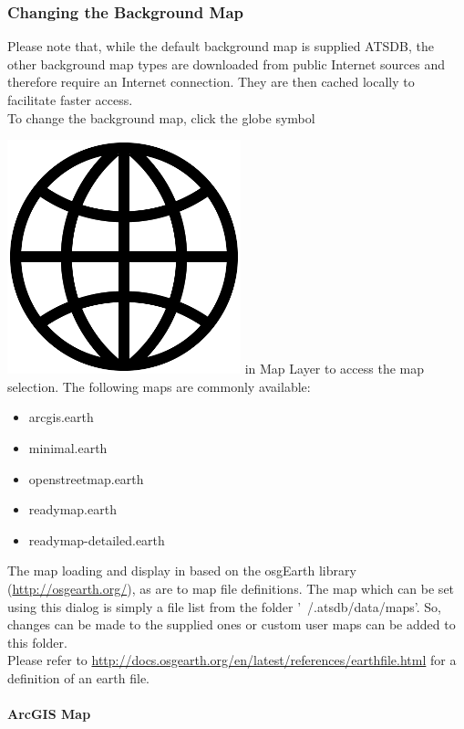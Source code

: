 \documentclass[10pt,letterpaper,extrafontsizes]{memoir}
\begin{document}
\subsubsection{Changing the Background Map}

Please note that, while the default background map is supplied ATSDB, the other background map types are downloaded from public Internet sources and therefore require an Internet connection. They are then cached locally to facilitate faster access. \\

To change the background map, click the globe symbol {\includegraphics[scale=0.05]{../../data/icons/globe.png} in Map Layer to access the map selection. The following maps are commonly available:

\begin{itemize}
 \item arcgis.earth
 \item minimal.earth
 \item openstreetmap.earth
 \item readymap.earth
 \item readymap-detailed.earth
\end{itemize}

The map loading and display in based on the osgEarth library (\url{http://osgearth.org/}), as are to map file definitions. The map which can be set using this dialog is simply a file list from the folder '~/.atsdb/data/maps'. So, changes can be made to the supplied ones or custom user maps can be added to this folder. \\
Please refer to \url{http://docs.osgearth.org/en/latest/references/earthfile.html} for a definition of an earth file.

\newpage
\paragraph{ArcGIS Map}

}
\end{document}

